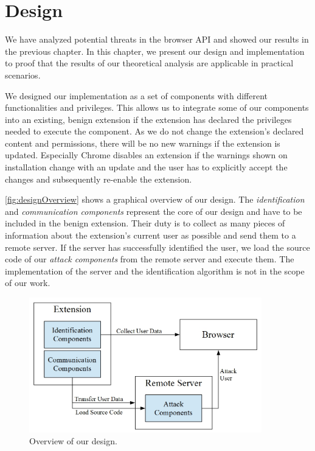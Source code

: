 
\chapter{Design}
\label{chp:design}

	We have analyzed potential threats in the browser API and showed our results in the previous chapter. In this chapter, we present our design and implementation to proof that the results of our theoretical analysis are applicable in practical scenarios. 
	
	We designed our implementation as a set of components with different functionalities and privileges. This allows us to integrate some of our components into an existing, benign extension if the extension has declared the privileges needed to execute the component. As we do not change the extension's declared content and permissions, there will be no new warnings if the extension is updated. Especially Chrome disables an extension if the warnings shown on installation change with an update and the user has to explicitly accept the changes and subsequently re-enable the extension. 
	
	\autoref{fig:designOverview} shows a graphical overview of our design. The \textit{identification} and \textit{communication components} represent the core of our design and have to be included in the benign extension. Their duty is to collect as many pieces of information about the extension's current user as possible and send them to a remote server. If the server has successfully identified the user, we load the source code of our \textit{attack components} from the remote server and execute them. The implementation of the server and the identification algorithm is not in the scope of our work. 
	
	\begin{figure}[h]
		\centering
		\includegraphics[width=0.9\textwidth]{./graphics/design_overview.jpeg}
		\caption{Overview of our design.}
		\label{fig:designOverview}
	\end{figure}
	
